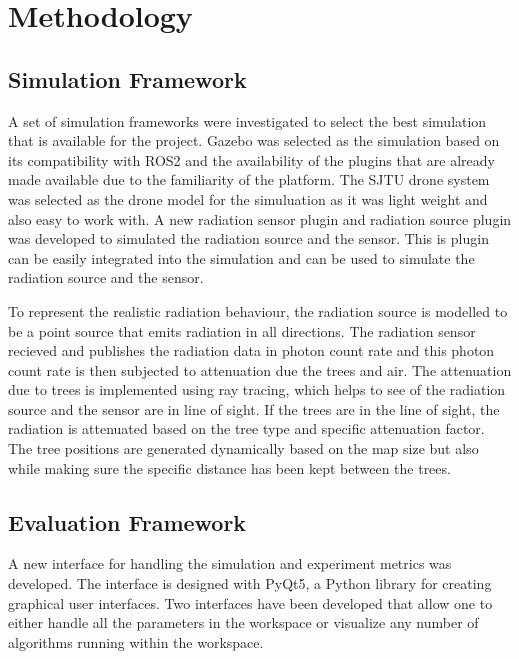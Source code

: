 \documentclass[../report.tex]{subfiles}
\begin{document}
    \section{Methodology}
    \label{sec:methodology}


    \subsection{Simulation Framework}
    A set of simulation frameworks were investigated to select the best simulation that is available for the project. Gazebo was selected as the simulation based on its compatibility with ROS2 and the
    availability of the plugins that are already made available due to the familiarity of the platform. The SJTU drone system was selected as the drone model for the simuluation as it was light weight and 
    also easy to work with. A new radiation sensor plugin and radiation source plugin was developed to simulated the radiation source and the sensor. This is plugin can be easily integrated 
    into the simulation and can be used to simulate the radiation source and the sensor. 

    To represent the realistic radiation behaviour, the radiation source is modelled to be a point source that emits radiation in all directions. The radiation sensor recieved and publishes the radiation 
    data in photon count rate and this photon count rate is then subjected to attenuation due the trees and air. The attenuation due to trees is implemented using ray tracing, which helps to see of the radiation source and the sensor
    are in line of sight. If the trees are in the line of sight, the radiation is attenuated based on the tree type and specific attenuation factor. The tree positions are generated dynamically based on the map size but also while 
    making sure the specific distance has been kept between the trees.
    

    \subsection{Evaluation Framework}

    A new interface for handling the simulation and experiment metrics was developed. The interface is designed with PyQt5, a Python library for creating graphical user interfaces. 
    Two interfaces have been developed that allow one to either handle all the parameters in the workspace or visualize any number of algorithms running within the workspace.
    
\end{document}
